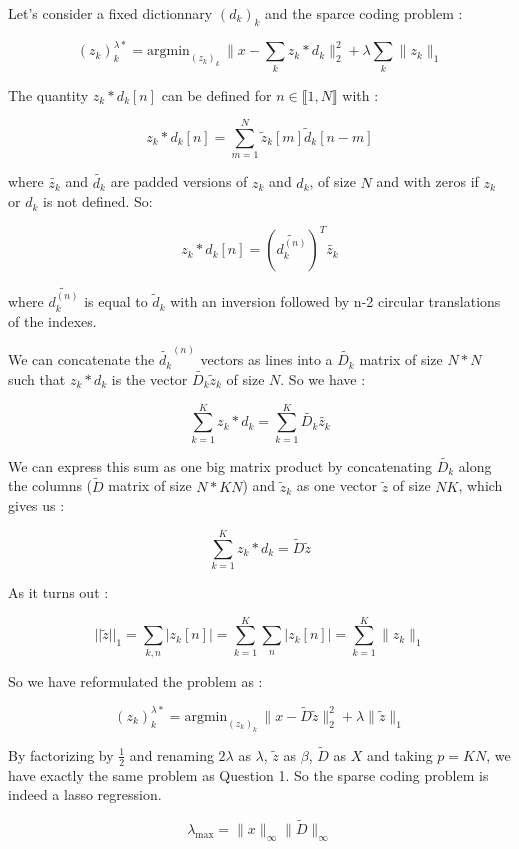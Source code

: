 \documentclass[11pt]{article}
\begin{document}
\begin{solution}  %


Let's consider a fixed dictionnary $(d_k)_k$ and the sparce coding problem :

$$(z_{k})_k^{\lambda*} = \textrm{argmin}_{(z_k)_k}\, \|x-\sum_k z_k * d_k \|_2^2+\lambda \sum_k \|z_k\|_1$$

The quantity $z_k*d_k[n]$ can be defined for $n \in \llbracket 1,N\rrbracket$ with :

$$z_k*d_k[n] = \sum_{m=1}^{N} \tilde{z}_k[m]\tilde{d}_k[n-m]$$

where $\tilde{z_k}$ and $\tilde{d_k}$ are padded versions of $z_k$ and $d_k$, of size $N$ and with zeros if $z_k$ or $d_k$ is not defined. So:

$$z_k*d_k[n] = (\tilde{d_k^{(n)}})^T\tilde{z_k}$$

where $\tilde{d_k^{(n)}}$ is equal to $\tilde{d}_k$ with an inversion followed by n-2 circular translations of the indexes. 

We can concatenate the $\tilde{d_k}^{(n)}$ vectors as lines into a $\tilde{D_k}$ matrix of size $N*N$ such that $z_k*d_k$ is the vector $\tilde{D_k}\tilde{z}_k$ of size $N$. So we have :

$$\sum_{k=1}^K z_k*d_k = \sum_{k=1}^K \tilde{D_k}\tilde{z_k}$$

We can express this sum as one big matrix product by concatenating $\tilde{D_k}$ along the columns ($\tilde{D}$ matrix of size $N*KN$) and $\tilde{z}_k$ as one vector $\tilde{z}$ of size $NK$, which gives us :

$$\sum_{k=1}^K z_k*d_k = \tilde{D}\tilde{z} $$

As it turns out : 

$$||\tilde{z}||_1 = \sum_{k,n} |z_k[n]|=\sum_{k=1}^K \sum_n |z_k[n]| = \sum_{k=1}^K \|z_k\|_1$$

So we have reformulated the problem as :

$$(z_{k})_k^{\lambda*} = \textrm{argmin}_{(z_k)_k}\, \|x-\tilde{D}\tilde{z}\|_2^2+\lambda \|\tilde{z}\|_1$$

By factorizing by $\frac{1}{2}$ and renaming $2\lambda$ as $\lambda$, $\tilde{z}$ as $\beta$, $\tilde{D}$ as $X$ and taking $p = KN$, we have exactly the same problem as Question 1. So the sparse coding problem is indeed a lasso regression.

\begin{equation}
    \lambda_{\max} = \|x\|_{\infty}\|\tilde{D}\|_{\infty}
\end{equation}

\end{solution}
\end{document}
